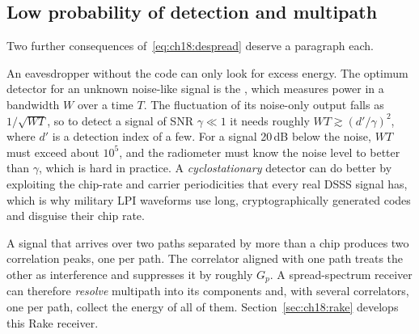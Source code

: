 
\subsection{Low probability of detection and multipath}

Two further consequences of~\eqref{eq:ch18:despread} deserve a paragraph each.

An eavesdropper without the code can only look for excess energy. The optimum detector for
an unknown noise-like signal is the , which measures power in a bandwidth
$W$ over a time $T$. The fluctuation of its noise-only output falls as $1/\sqrt{WT}$, so to
detect a signal of SNR $\gamma\ll1$ it needs roughly $WT\gtrsim(d'/\gamma)^2$, where $d'$ is a
detection index of a few. For a signal 20\,dB below the noise, $WT$ must exceed about $10^5$,
and the radiometer must know the noise level to better than $\gamma$, which is hard in
practice. A \emph{cyclostationary} detector can do better by exploiting the chip-rate and
carrier periodicities that every real DSSS signal has, which is why military LPI waveforms
use long, cryptographically generated codes and disguise their chip rate.

A signal that arrives over two paths separated by more than a chip produces two correlation
peaks, one per path. The correlator aligned with one path treats the other as interference
and suppresses it by roughly $G_p$. A spread-spectrum receiver can therefore
\emph{resolve} multipath into its components and, with several correlators, one per path,
collect the energy of all of them. Section~\ref{sec:ch18:rake} develops this Rake receiver.

